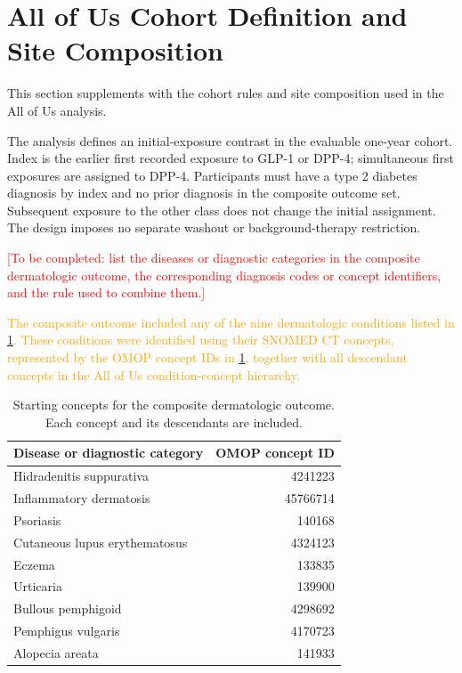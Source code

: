 \documentclass[12pt]{article}
\begin{document}
\section{All of Us Cohort Definition and Site Composition}\label{supp:aou_sites}
This section supplements  with the cohort rules and site composition used in the All of Us analysis.

The analysis defines an initial-exposure contrast in the evaluable one-year cohort. Index is the earlier first recorded exposure to GLP-1 or DPP-4; simultaneous first exposures are assigned to DPP-4. Participants must have a type 2 diabetes diagnosis by index and no prior diagnosis in the composite outcome set. Subsequent exposure to the other class does not change the initial assignment. The design imposes no separate washout or background-therapy restriction.

\textcolor{red}{[To be completed: list the diseases or diagnostic categories in the composite dermatologic outcome, the corresponding diagnosis codes or concept identifiers, and the rule used to combine them.]}

\textcolor{orange}{The composite outcome included any of the nine dermatologic conditions listed in \cref{tab:aou_outcome_concepts}. These conditions were identified using their SNOMED CT concepts, represented by the OMOP concept IDs in \cref{tab:aou_outcome_concepts}, together with all descendant concepts in the All of Us condition-concept hierarchy.}

\begin{table}[!htbp]
\centering
\color{orange}
\caption{Starting concepts for the composite dermatologic outcome. Each concept and its descendants are included.}
\label{tab:aou_outcome_concepts}
\begin{tabular}{lr}
\toprule
Disease or diagnostic category & OMOP concept ID\\
\midrule
Hidradenitis suppurativa & 4241223\\
Inflammatory dermatosis & 45766714\\
Psoriasis & 140168\\
Cutaneous lupus erythematosus & 4324123\\
Eczema & 133835\\
Urticaria & 139900\\
Bullous pemphigoid & 4298692\\
Pemphigus vulgaris & 4170723\\
Alopecia areata & 141933\\
\bottomrule
\end{tabular}
\end{table}
\end{document}
